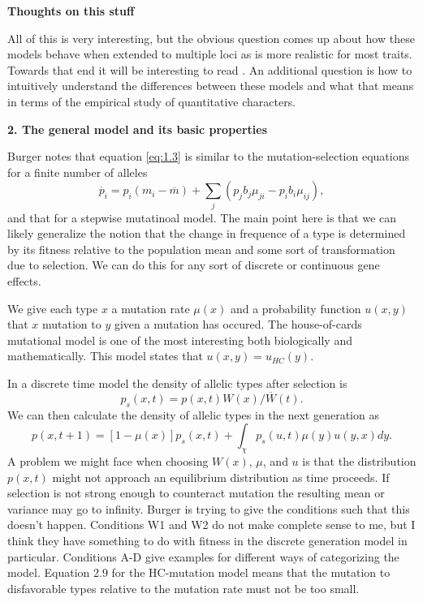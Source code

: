 \begin{flushright}
\textbf{Thoughts on this stuff} \\
\end{flushright}

All of this is very interesting, but the obvious question comes up about how these models behave when extended to
multiple loci as is more realistic for most traits. Towards that end it will be interesting to read \citet{Lande2007}.
An additional question is how to intuitively understand the differences between these models and what that means in terms 
of the empirical study of quantitative characters. 

\begin{flushright}
\textbf{2. The general model and its basic properties}\\
\end{flushright}

Burger notes that equation \ref{eq:1.3} is similar to the mutation-selection equations for a finite number of alleles
\begin{equation}
\dot{p_i}=p_i(m_i-\overline{m}) + \sum_j\left( p_jb_j\mu_{ji}-p_ib_i\mu_{ij}\right),
\end{equation}
and that for a stepwise mutatinoal model. The main point here is that we can likely generalize the notion that the
change in frequence of a type is determined by its fitness relative to the population mean and some sort of
transformation due to selection. We can do this for any sort of discrete or continuous gene effects.

We give each type $x$ a mutation rate $\mu(x)$ and a probability function $u(x,y)$ that $x$ mutation to $y$ given a
mutation has occured. The house-of-cards mutational model is one of the most interesting both biologically and
mathematically. This model states that $u(x,y)=u_{HC}(y)$. 

In a discrete time model the density of allelic types after selection is 
\begin{equation}\label{eq:sel}
p_s(x,t) = p(x,t)W(x)/\overline{W}(t).
\end{equation}
We can then calculate the density of allelic types in the next generation as
\begin{equation}\label{eq:mut}
p(x,t+1) = \left[1-\mu(x)\right]p_s(x,t) + \int_{\chi}p_s(u,t)\mu(y)u(y,x)dy.
\end{equation}
A problem we might face when choosing $W(x)$, $\mu$, and $u$ is that the distribution $p(x,t)$ might not approach an
equilibrium distribution as time proceeds. If selection is not strong enough to counteract mutation the resulting mean
or variance may go to infinity. Burger is trying to give the conditions such that this doesn't happen. Conditions W1 and
W2 do not make complete sense to me, but I think they have something to do with fitness in the discrete generation model
in particular. Conditions A-D give examples for different ways of categorizing the model. Equation 2.9 for the
HC-mutation model means that the mutation to disfavorable types relative to the mutation rate must not be too small.

